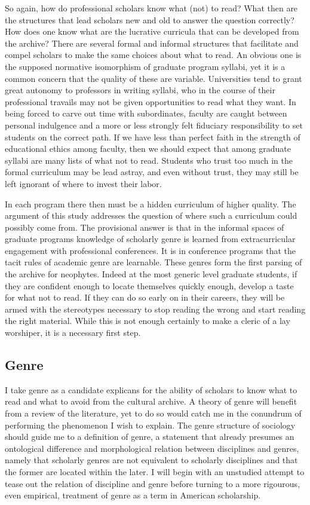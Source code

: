 \documentclass[]{book}
\theoremstyle{definition}
\theoremstyle{definition}
\theoremstyle{definition}
\theoremstyle{remark}
\begin{document}
So again, how do professional scholars know what (not) to read? What
then are the structures that lead scholars new and old to answer the
question correctly? How does one know what are the lucrative curricula
that can be developed from the archive? There are several formal and
informal structures that facilitate and compel scholars to make the same
choices about what to read. An obvious one is the supposed normative
isomorphism of graduate program syllabi, yet it is a common concern that
the quality of these are variable. Universities tend to grant great
autonomy to professors in writing syllabi, who in the course of their
professional travails may not be given opportunities to read what they
want. In being forced to carve out time with subordinates, faculty are
caught between personal indulgence and a more or less strongly felt
fiduciary responsibility to set students on the correct path. If we have
less than perfect faith in the strength of educational ethics among
faculty, then we should expect that among graduate syllabi are many
lists of what not to read. Students who trust too much in the formal
curriculum may be lead astray, and even without trust, they may still be
left ignorant of where to invest their labor.

In each program there then must be a hidden curriculum of higher
quality. The argument of this study addresses the question of where such
a curriculum could possibly come from. The provisional answer is that in
the informal spaces of graduate programs knowledge of scholarly genre is
learned from extracurricular engagement with professional conferences.
It is in conference programs that the tacit rules of academic genre are
learnable. These genres form the first parsing of the archive for
neophytes. Indeed at the most generic level graduate students, if they
are confident enough to locate themselves quickly enough, develop a
taste for what not to read. If they can do so early on in their careers,
they will be armed with the stereotypes necessary to stop reading the
wrong and start reading the right material. While this is not enough
certainly to make a cleric of a lay worshiper, it is a necessary first
step.

\hypertarget{genre}{%
\subsection{Genre}\label{genre}}

I take genre as a candidate explicans for the ability of scholars to
know what to read and what to avoid from the cultural archive. A theory
of genre will benefit from a review of the literature, yet to do so
would catch me in the conundrum of performing the phenomenon I wish to
explain. The genre structure of sociology should guide me to a
definition of genre, a statement that already presumes an ontological
difference and morphological relation between disciplines and genres,
namely that scholarly genres are not equivalent to scholarly disciplines
and that the former are located within the later. I will begin with an
unstudied attempt to tease out the relation of discipline and genre
before turning to a more rigourous, even empirical, treatment of genre
as a term in American scholarship.
\end{document}
